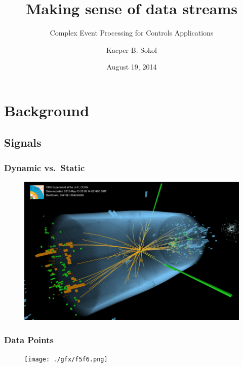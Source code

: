 \documentclass{beamer}
\begin{document}
\title{Making sense of data streams}
\subtitle{Complex Event Processing for Controls Applications}
\author{Kacper B. Sokol}
\date{August 19, 2014}

\begin{frame}[plain]
	\titlepage
\end{frame}



\section{Background} 
  \subsection{Signals}
  \begin{frame}[foot]
    \frametitle{Dynamic vs.\ Static}
    \begin{figure}
      \includegraphics[scale=.7]{./gfx/CMS.png}
    \end{figure}
  \end{frame}

  \begin{frame}[foot]
    \frametitle{Data Points}
    \begin{figure}
      \texttt{[image: ./gfx/f5f6.png]}
    \end{figure}
  \end{frame}
\end{document}
